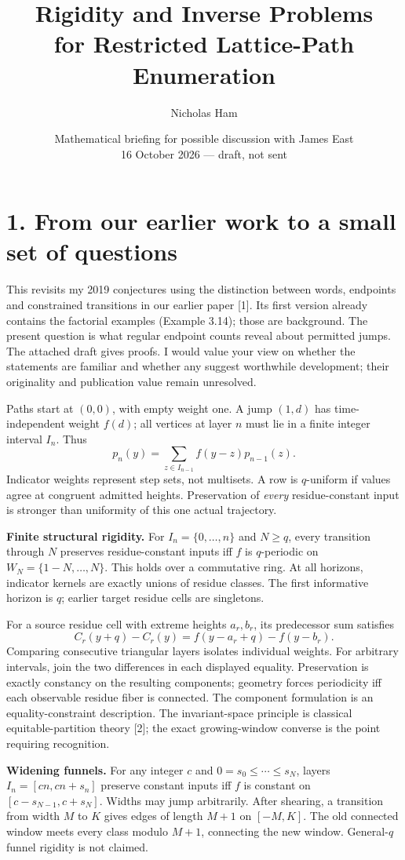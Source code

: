 \documentclass[10pt]{article}
\title{Rigidity and Inverse Problems\\for Restricted Lattice-Path Enumeration}
\author{Nicholas Ham}
\date{Mathematical briefing for possible discussion with James East\\16 October 2026 --- draft, not sent}
\begin{document}
\maketitle
\section*{1. From our earlier work to a small set of questions}
This revisits my 2019 conjectures using the distinction between words, endpoints and constrained transitions in our earlier paper [1]. Its first version already contains the factorial examples (Example 3.14); those are background. The present question is what regular endpoint counts reveal about permitted jumps. The attached draft gives proofs. I would value your view on whether the statements are familiar and whether any suggest worthwhile development; their originality and publication value remain unresolved.

Paths start at $(0,0)$, with empty weight one. A jump $(1,d)$ has time-independent weight $f(d)$; all vertices at layer $n$ must lie in a finite integer interval $I_n$. Thus
\[
p_n(y)=\sum_{z\in I_{n-1}}f(y-z)p_{n-1}(z).
\]
Indicator weights represent step sets, not multisets. A row is $q$-uniform if values agree at congruent admitted heights. Preservation of \emph{every} residue-constant input is stronger than uniformity of this one actual trajectory.

\textbf{Finite structural rigidity.} For $I_n=\{0,\ldots,n\}$ and $N\ge q$, every transition through $N$ preserves residue-constant inputs iff $f$ is $q$-periodic on $W_N=\{1-N,\ldots,N\}$. This holds over a commutative ring. At all horizons, indicator kernels are exactly unions of residue classes. The first informative horizon is $q$; earlier target residue cells are singletons.

For a source residue cell with extreme heights $a_r,b_r$, its predecessor sum satisfies
\[
C_r(y+q)-C_r(y)=f(y-a_r+q)-f(y-b_r).
\]
Comparing consecutive triangular layers isolates individual weights. For arbitrary intervals, join the two differences in each displayed equality. Preservation is exactly constancy on the resulting components; geometry forces periodicity iff each observable residue fiber is connected. The component formulation is an equality-constraint description. The invariant-space principle is classical equitable-partition theory [2]; the exact growing-window converse is the point requiring recognition.

\textbf{Widening funnels.} For any integer $c$ and $0=s_0\le\cdots\le s_N$, layers $I_n=[cn,cn+s_n]$ preserve constant inputs iff $f$ is constant on $[c-s_{N-1},c+s_N]$. Widths may jump arbitrarily. After shearing, a transition from width $M$ to $K$ gives edges of length $M+1$ on $[-M,K]$. The old connected window meets every class modulo $M+1$, connecting the new window. General-$q$ funnel rigidity is not claimed.
\newpage
\end{document}
